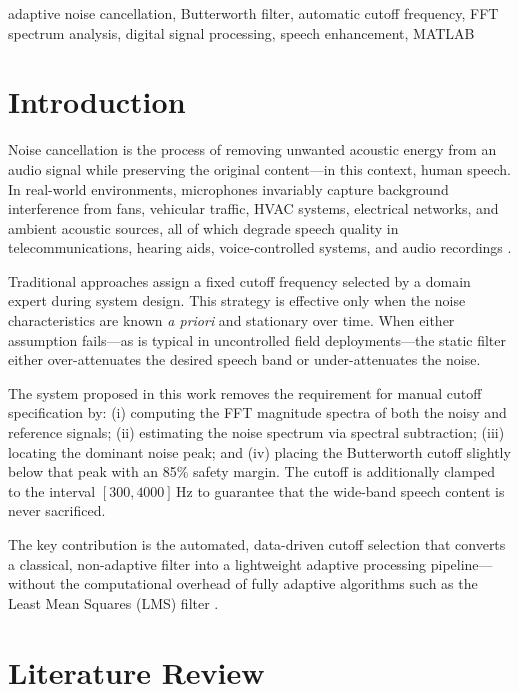 \documentclass[conference]{IEEEtran}
\begin{document}
\begin{IEEEkeywords}
adaptive noise cancellation, Butterworth filter, automatic cutoff frequency,
FFT spectrum analysis, digital signal processing, speech enhancement,
MATLAB
\end{IEEEkeywords}

\section{Introduction}

Noise cancellation is the process of removing unwanted acoustic energy from
an audio signal while preserving the original content---in this context, human
speech. In real-world environments, microphones invariably capture background
interference from fans, vehicular traffic, HVAC systems, electrical networks,
and ambient acoustic sources, all of which degrade speech quality in
telecommunications, hearing aids, voice-controlled systems, and audio
recordings \cite{oppenheim2009}.

Traditional approaches assign a fixed cutoff frequency selected by a domain
expert during system design. This strategy is effective only when the
noise characteristics are known \emph{a priori} and stationary over time.
When either assumption fails---as is typical in uncontrolled field
deployments---the static filter either over-attenuates the desired speech band
or under-attenuates the noise.

The system proposed in this work removes the requirement for manual cutoff
specification by: (i) computing the FFT magnitude spectra of both the noisy
and reference signals; (ii) estimating the noise spectrum via spectral
subtraction; (iii) locating the dominant noise peak; and (iv) placing the
Butterworth cutoff slightly below that peak with an 85\% safety margin.
The cutoff is additionally clamped to the interval
$[300, 4000]$\,Hz to guarantee that the wide-band speech content is never
sacrificed.

The key contribution is the automated, data-driven cutoff selection that
converts a classical, non-adaptive filter into a lightweight adaptive
processing pipeline---without the computational overhead of fully adaptive
algorithms such as the Least Mean Squares (LMS) filter \cite{widrow1960}.

\section{Literature Review}
\end{document}
